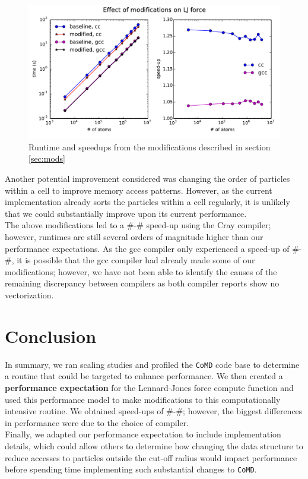 \documentclass[12pt]{article}
\begin{document}
\begin{figure}[h!]
  \centering
  \includegraphics[width=\textwidth]{../figs/modified_forceLJ}
  \caption{Runtime and speedups from the modifications described in
    section \ref{sec:mods}}
  \label{fig:mod-force}
\end{figure}

\noindent Another potential improvement considered was changing the order of
particles within a cell to improve memory access patterns. However, as the
current implementation already sorts the particles within a cell regularly, it is unlikely 
that we could substantially improve upon its current performance. \\

\noindent The above modifications led to a \#-\# speed-up using the Cray
compiler; however, runtimes are still several orders of magnitude higher than our
performance expectations. As the gcc compiler only experienced a speed-up of \#-\#, 
it is possible that the gcc compiler had already made some of our modifications;
however, we have not been able to identify the causes of the remaining discrepancy 
between compilers as both compiler reports show no vectorization.

\section{Conclusion}
\noindent In summary, we ran scaling studies and profiled the \texttt{CoMD} code base to 
determine a routine that could be targeted to enhance performance. We then created a 
{\bf performance expectation} for the Lennard-Jones force compute function and used this performance 
model to make modifications to this computationally intensive routine. We obtained speed-ups of
\#-\#; however, the biggest differences in performance were due to the choice of compiler. \\
Finally, we adapted our performance expectation to include implementation details, which could allow 
others to determine how changing the data structure to reduce accesses to particles outside 
the cut-off radius would impact performance before spending time implementing such substantial changes 
to \texttt{CoMD}.
\end{document}
